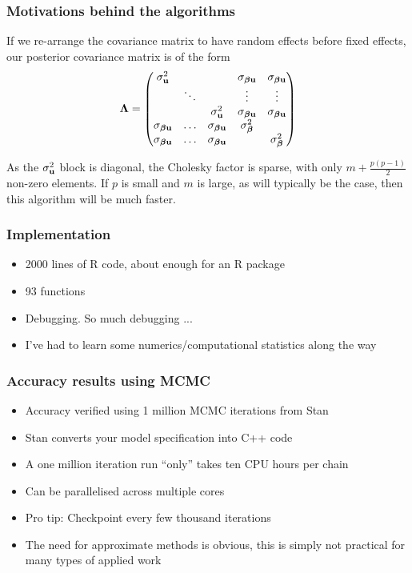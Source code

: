 \documentclass{beamer}
\begin{document}
\begin{frame}
\frametitle{Motivations behind the algorithms}
If we re-arrange the covariance matrix to have random effects before
fixed effects, our posterior covariance matrix is of the form
\begin{align*} {\boldsymbol\Lambda} =
\begin{pmatrix}
\sigma_{\bf u}^2 & & & \sigma_{{\boldsymbol \beta} {\bf u}} & \sigma_{{\boldsymbol \beta} {\bf u}} \\
& \ddots & & \vdots & \vdots \\
& & \sigma_{\bf u}^2 & \sigma_{{\boldsymbol \beta} {\bf u}} & \sigma_{{\boldsymbol \beta} {\bf u}} \\
\sigma_{{\boldsymbol \beta} {\bf u}} & \ldots & \sigma_{{\boldsymbol \beta} {\bf u}} & \sigma_{\boldsymbol \beta}^2 \\
\sigma_{{\boldsymbol \beta} {\bf u}} & \ldots &\sigma_{{\boldsymbol \beta} {\bf u}}  & & \sigma_{\boldsymbol \beta}^2
\end{pmatrix}
\end{align*}

As the $\sigma_{\bf u}^2$ block is diagonal, the Cholesky factor is 
sparse, with only $m + \frac{p(p-1)}{2}$ non-zero elements. If $p$ is small
and $m$ is large, as will typically be the case, then this algorithm will
be much faster.

\end{frame}

\begin{frame}
\frametitle{Implementation}
\begin{itemize}
\item 2000 lines of R code, about enough for an R package
\item 93 functions
\item Debugging. So much debugging ...
\item I've had to learn some numerics/computational statistics along the
way
\end{itemize}
\end{frame}

\begin{frame}
\frametitle{Accuracy results using MCMC}
\begin{itemize}
\item Accuracy verified using 1 million MCMC iterations from Stan
\item Stan converts your model specification into C++ code
\item A one million iteration run ``only'' takes ten CPU hours per chain
\item Can be parallelised across multiple cores
\item Pro tip: Checkpoint every few thousand iterations
\item The need for approximate methods is obvious, this is simply not
practical for many types of applied work
\end{itemize}
\end{frame}
\end{document}
